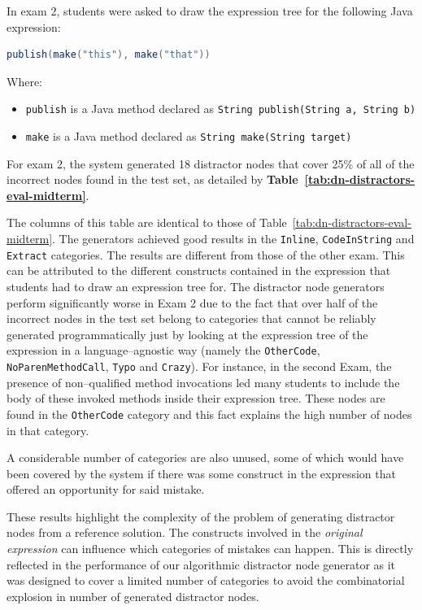 \begin{chapterBody}
In exam 2, students were asked to draw the expression tree for the following Java
expression:

\begin{lstlisting}[language=java]
publish(make("this"), make("that"))
\end{lstlisting}

Where:

\begin{itemize}
    \item \texttt{publish} is a Java method declared as
\texttt{String publish(String a, String b)}
    \item \texttt{make} is a Java method declared as
\texttt{String make(String target)}
\end{itemize}

For exam 2, the system generated 18 distractor nodes that cover 25\% of all of the
incorrect nodes found in the test set, as detailed by
\textbf{Table~\ref{tab:dn-distractors-eval-midterm}}.

The columns of this table are identical to those of
Table~\ref{tab:dn-distractors-eval-midterm}.
The generators achieved good results in the \texttt{Inline}, \texttt{CodeInString}
and \texttt{Extract} categories.
The results are different from those of the other exam. This can be attributed
to the different constructs contained in the expression that students had to
draw an expression tree for.
The distractor node generators perform significantly worse in Exam 2
due to the fact that over half of the incorrect nodes in the test set
belong to categories that cannot be reliably generated programmatically just by
looking at the expression tree of the expression in a language–agnostic way
(namely the \texttt{OtherCode}, \texttt{NoParenMethodCall}, \texttt{Typo} and
\texttt{Crazy}). 
For instance, in the second Exam, the presence of non–qualified method invocations
led many students to include the body of these invoked methods inside their
expression tree. These nodes are found in the \texttt{OtherCode} category and
this fact explains the high number of nodes in that category.

A considerable number of categories are also unused, some of which would have
been covered by the system if there was some construct in the expression
that offered an opportunity for said mistake.

These results highlight the complexity of the problem of generating distractor
nodes from a reference solution. The constructs involved in the \textit{original
expression} can influence which categories of mistakes can happen. This is
directly reflected in the performance of our algorithmic distractor node
generator as it was designed to cover a limited number of categories to
avoid the combinatorial explosion in number of generated distractor nodes.


\end{chapterBody}
